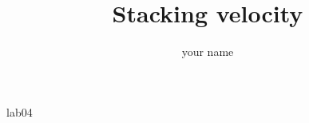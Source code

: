 
\def\thisdoc{lab04}
\def\exedirs{midpts}

\author{your name}
\title{Stacking velocity}{\thisdoc}

%



%

\tiny
\clearpage

\normalsize

